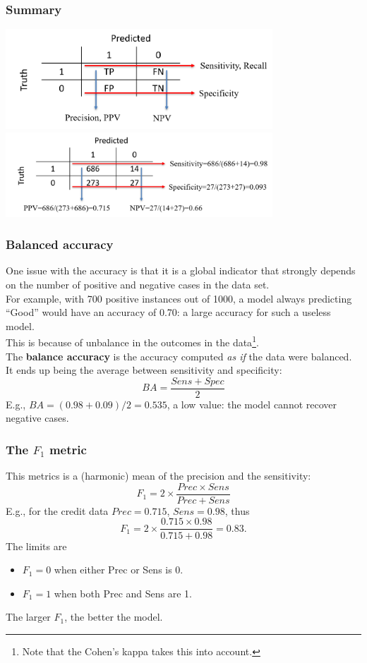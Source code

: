 \begin{frame}
\frametitle{Summary}
\begin{center}
\includegraphics[width=10cm]{../Graphs/CondProb.png}\\
\includegraphics[width=10cm]{../Graphs/CondProb_example.png}\\
\end{center}
\end{frame}
\begin{frame}
\frametitle{Balanced accuracy}
One issue with the accuracy is that it is a global indicator that strongly depends on the number of positive and negative cases in the data set.\\
\vspace{0.2cm}
For example, with 700 positive instances out of 1000, a model always predicting ``Good'' would have an accuracy of 0.70: a large accuracy for such a useless model.\\
\vspace{0.2cm}
This is because of unbalance in the outcomes in the data\footnote{Note that the Cohen's kappa takes this into account.}.\\
\vspace{0.3cm} 
The {\bf balance accuracy} is the accuracy computed {\it as if} the data were balanced. It ends up being the average between sensitivity and specificity:
$$
BA = \frac{Sens+Spec}{2}
$$
E.g., $BA=(0.98+0.09)/2=0.535$, a low value: the model cannot recover negative cases.
\end{frame}
\begin{frame}
\frametitle{The $F_1$ metric}
This metrics is a (harmonic) mean of the precision and the sensitivity:
$$
F_1 = 2 \times \frac{Prec\times Sens}{Prec+Sens}
$$
E.g., for the credit data $Prec = 0.715$, $Sens = 0.98$, thus
$$
F_1 = 2 \times\frac{0.715\times 0.98}{0.715+0.98} = 0.83.
$$
The limits are 
\begin{itemize}
\item $F_1 = 0$ when either Prec or Sens is 0. 
\item $F_1 = 1$ when both Prec and Sens are 1. 
\end{itemize}
The larger $F_1$, the better the model.
\end{frame}
